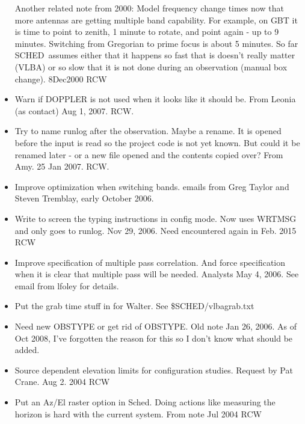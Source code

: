 \documentclass{report}
\newcommand{\schedb}{{\sc SCHED~}}
\begin{document}
\begin{itemize}
      Another related note from 2000:  Model frequency change times 
      now that more antennas are getting multiple band capability.  
      For example, on GBT it is time to
      point to zenith, 1 minute to rotate, and point again - up to
      9 minutes.  Switching from Gregorian to prime focus is about
      5 minutes.  So far \schedb assumes either that it happens so
      fast that is doesn't really matter (VLBA) or so slow that it
      is not done during an observation (manual box change).
      8Dec2000 RCW

\item Warn if DOPPLER is not used when it looks like it should be.
      From Leonia (as contact) Aug 1, 2007.  RCW.

\item Try to name runlog after the observation.  Maybe a rename.  It
      is opened before the input is read so the project code is not yet 
      known.  But could it be renamed later - or a new file opened and the
      contents copied over?  From Amy.  25 Jan 2007.  RCW.

\item Improve optimization when switching bands.  emails from Greg Taylor and
      Steven Tremblay, early October 2006.

\item Write to screen the typing instructions in config mode.  Now uses
      WRTMSG and only goes to runlog.  Nov 29, 2006.  Need encountered again
      in Feb. 2015  RCW

\item Improve specification of multiple pass correlation.  And force
      specification when it is clear that multiple pass will be needed.
      Analysts  May 4, 2006.  See email from lfoley for details.

\item Put the grab time stuff in for Walter.  See \$SCHED/vlbagrab.txt

\item Need new OBSTYPE or get rid of OBSTYPE.  Old note  Jan 26, 2006.
      As of Oct 2008, I've forgotten the reason for this so I don't
      know what should be added.

\item Source dependent elevation limits for configuration studies.
      Request by Pat Crane.  Aug 2. 2004 RCW

\item Put an Az/El raster option in Sched.  Doing actions like measuring
      the horizon is hard with the current system.  From note Jul 2004 RCW


\end{itemize}
\end{document}
